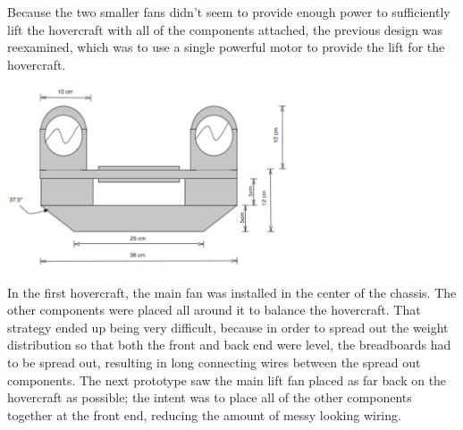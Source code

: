 Because the two smaller fans didn't seem to provide enough power to sufficiently lift the hovercraft with all of the components
attached, the previous design was reexamined, which was to use a single powerful motor to provide the lift for the hovercraft. 

\begin{minipage}{6.5in}
\begin{center}
  \includegraphics[width=85mm]{imageSources/Frontfinal.png}
\end{center}
\label{finaltop}
\end{minipage}

In the first hovercraft, the main fan was installed in the center of the chassis.  The other components were placed all around it to 
balance the hovercraft. That strategy ended up being very difficult, because in order to spread out the weight distribution so that
both the front and back end were level, the breadboards had to be spread out, resulting in long connecting wires between the spread
out components. The next prototype saw the main lift fan placed as far back on the hovercraft as possible; the intent was to place all of the other components together at the front end, reducing the amount of messy looking wiring. 

